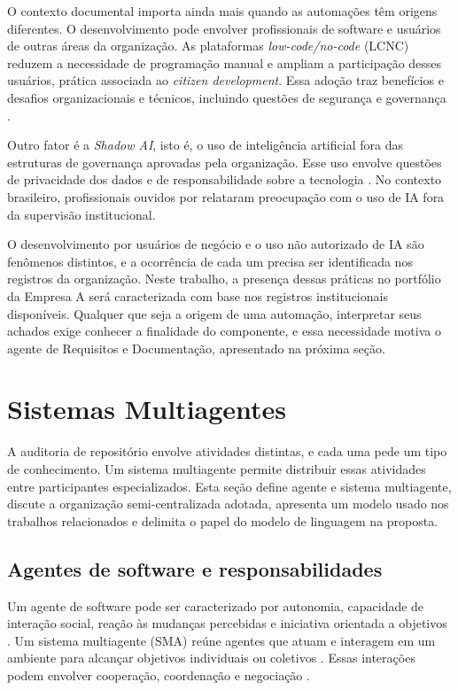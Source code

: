 O contexto documental importa ainda mais quando as automações têm origens diferentes. O desenvolvimento pode envolver profissionais de software e usuários de outras áreas da organização. As plataformas \textit{low-code/no-code} (LCNC) reduzem a necessidade de programação manual e ampliam a participação desses usuários, prática associada ao \textit{citizen development}. Essa adoção traz benefícios e desafios organizacionais e técnicos, incluindo questões de segurança e governança \cite{ajimati2025}.

Outro fator é a \textit{Shadow AI}, isto é, o uso de inteligência artificial fora das estruturas de governança aprovadas pela organização. Esse uso envolve questões de privacidade dos dados e de responsabilidade sobre a tecnologia \cite{silic2025}. No contexto brasileiro, profissionais ouvidos por  relataram preocupação com o uso de IA fora da supervisão institucional.

O desenvolvimento por usuários de negócio e o uso não autorizado de IA são fenômenos distintos, e a ocorrência de cada um precisa ser identificada nos registros da organização. Neste trabalho, a presença dessas práticas no portfólio da Empresa A será caracterizada com base nos registros institucionais disponíveis. Qualquer que seja a origem de uma automação, interpretar seus achados exige conhecer a finalidade do componente, e essa necessidade motiva o agente de Requisitos e Documentação, apresentado na próxima seção.

\section{Sistemas Multiagentes}
\label{rt-2-3}

A auditoria de repositório envolve atividades distintas, e cada uma pede um tipo de conhecimento. Um sistema multiagente permite distribuir essas atividades entre participantes especializados. Esta seção define agente e sistema multiagente, discute a organização semi-centralizada adotada, apresenta um modelo usado nos trabalhos relacionados e delimita o papel do modelo de linguagem na proposta. %

\subsection{Agentes de software e responsabilidades}
\label{rt-2-3-1}

Um agente de software pode ser caracterizado por autonomia, capacidade de interação social, reação às mudanças percebidas e iniciativa orientada a objetivos \cite{wooldridge1995}. Um sistema multiagente (SMA) reúne agentes que atuam e interagem em um ambiente para alcançar objetivos individuais ou coletivos \cite{wooldridge2009,lazarin2025}. Essas interações podem envolver cooperação, coordenação e negociação \cite{wooldridge2009}.


